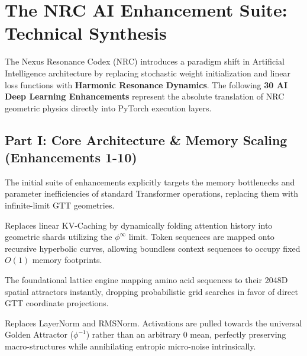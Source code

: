 \section{The NRC AI Enhancement Suite: Technical Synthesis}

The Nexus Resonance Codex (NRC) introduces a paradigm shift in Artificial Intelligence architecture by replacing stochastic weight initialization and linear loss functions with \textbf{Harmonic Resonance Dynamics}. The following \textbf{30 AI Deep Learning Enhancements} represent the absolute translation of NRC geometric physics directly into PyTorch execution layers.

\subsection{Part I: Core Architecture \& Memory Scaling (Enhancements 1-10)}

The initial suite of enhancements explicitly targets the memory bottlenecks and parameter inefficiencies of standard Transformer operations, replacing them with infinite-limit GTT geometries.

\begin{tcolorbox}[
	enhanced,
	colback=nrccream!85!white,
	colframe=nrcblue,
	boxrule=0.5mm,
	title=\textbf{1. $\phi^\infty$ Shard Folding Compression}
	]
	Replaces linear KV-Caching by dynamically folding attention history into geometric shards utilizing the $\phi^\infty$ limit. Token sequences are mapped onto recursive hyperbolic curves, allowing boundless context sequences to occupy fixed $O(1)$ memory footprints.
\end{tcolorbox}

\begin{tcolorbox}[
	enhanced,
	colback=nrccream!85!white,
	colframe=nrcblue,
	boxrule=0.5mm,
	title=\textbf{2. NRC Protein Folding Engine v2}
	]
	The foundational lattice engine mapping amino acid sequences to their 2048D spatial attractors instantly, dropping probabilistic grid searches in favor of direct GTT coordinate projections.
\end{tcolorbox}

\begin{tcolorbox}[
	enhanced,
	colback=nrccream!85!white,
	colframe=nrcblue,
	boxrule=0.5mm,
	title=\textbf{3. Golden Attractor Flow Normalisation v3 (GAFEN)}
	]
	Replaces LayerNorm and RMSNorm. Activations are pulled towards the universal Golden Attractor ($\phi^{-1}$) rather than an arbitrary 0 mean, perfectly preserving macro-structures while annihilating entropic micro-noise intrinsically.
\end{tcolorbox}

